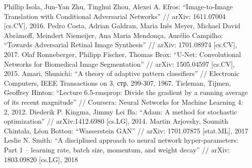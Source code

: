 \documentclass[a4paper]{article}
\begin{document}
\begin{thebibliography}{99}
		 Phillip Isola, Jun-Yan Zhu, Tinghui Zhou, Alexei A. Efros: ``Image-to-Image Translation with Conditional Adversarial Networks'' // arXiv: 1611.07004 [cs.CV], 2016.
		 Pedro Costa, Adrian Galdran, Maria Inês Meyer, Michael David Abràmoff, Meindert Niemeijer, Ana Maria Mendonça, Aurélio Campilho: ``Towards Adversarial Retinal Image Synthesis'' // arXiv: 1701.08974 [cs.CV], 2017.
		 Olaf Ronneberger, Philipp Fischer, Thomas Brox: ``U-Net: Convolutional Networks for Biomedical Image Segmentation'' // arXiv: 1505.04597 [cs.CV], 2015.
		 Amari, Shunichi: ``A theory of adaptive pattern classifiers'' // Electronic Computers, IEEE Transactions on 3, стр. 299-307, 1967.
		 Tieleman, Tijmen, Geoffrey Hinton: ``Lecture 6.5-rmsprop: Divide the gradient by a running average of its recent magnitude'' // Coursera: Neural Networks for Machine Learning 4: 2, 2012.
		 Diederik P. Kingma, Jimmy Lei Ba: ``Adam: A method for stochastic optimization'' // arXiv:1412.6980 [cs.LG], 2014.
		 Martin Arjovsky, Soumith Chintala, Léon Bottou: ``Wasserstein GAN'' // arXiv: 1701.07875 [stat.ML], 2017
		 Leslie N. Smith: ``A disciplined approach to neural network hyper-parameters: Part 1 -- learning rate, batch size, momentum, and weight decay'' // arXiv: 1803.09820 [cs.LG], 2018
	\end{thebibliography}
	
\end{document}
